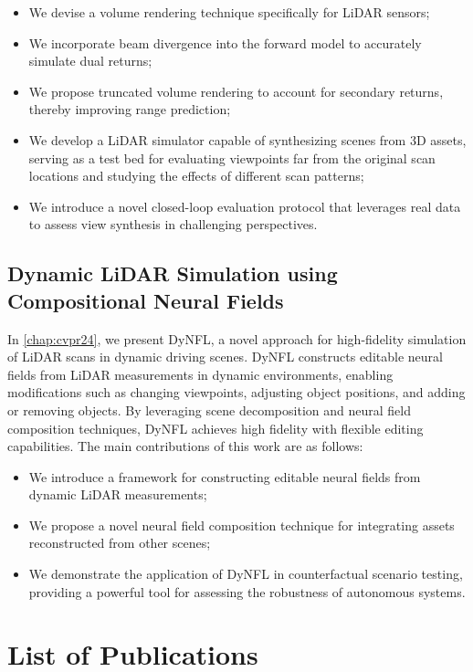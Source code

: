 \begin{itemize}
\item We devise a volume rendering technique specifically for LiDAR sensors;
\item We incorporate beam divergence into the forward model to accurately simulate dual returns;
\item We propose truncated volume rendering to account for secondary returns, thereby improving range prediction;
\item We develop a LiDAR simulator capable of synthesizing scenes from 3D assets, serving as a test bed for evaluating viewpoints far from the original scan locations and studying the effects of different scan patterns;
\item We introduce a novel closed-loop evaluation protocol that leverages real data to assess view synthesis in challenging perspectives.
\end{itemize}


\subsection{Dynamic LiDAR Simulation using Compositional Neural Fields}
In \cref{chap:cvpr24}, we present DyNFL, a novel approach for high-fidelity simulation of LiDAR scans in dynamic driving scenes. DyNFL constructs editable neural fields from LiDAR measurements in dynamic environments, enabling modifications such as changing viewpoints, adjusting object positions, and adding or removing objects. By leveraging scene decomposition and neural field composition techniques, DyNFL achieves high fidelity with flexible editing capabilities. The main contributions of this work are as follows:

\begin{itemize}
\item We introduce a framework for constructing editable neural fields from dynamic LiDAR measurements;
\item We propose a novel neural field composition technique for integrating assets reconstructed from other scenes;
\item We demonstrate the application of DyNFL in counterfactual scenario testing, providing a powerful tool for assessing the robustness of autonomous systems.
\end{itemize}

\section{List of Publications}
\label{sec:pub}

